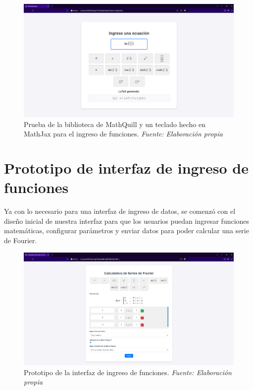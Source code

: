 \begin{figure}[H]
	\centering
	\includegraphics[width=1\textwidth]{img/chapter06/prueba_mathquill_mathjax.png}
	\caption[Prueba de la biblioteca de MathQuill y un teclado hecho en MathJax para el ingreso de funciones.]{Prueba de la biblioteca de MathQuill y un teclado hecho en MathJax para el ingreso de funciones. \textit{Fuente: Elaboración propia}}
	\label{fig:prueba_mathquill_mathjax}
\end{figure}

\section{Prototipo de interfaz de ingreso de funciones}
Ya con lo necesario para una interfaz de ingreso de datos, se comenzó con el diseño inicial de nuestra interfaz para que los usuarios puedan ingresar funciones matemáticas, configurar parámetros y enviar datos para poder calcular una serie de Fourier.

\begin{figure}[H]
	\centering
	\includegraphics[width=1\textwidth]{img/chapter06/prueba_UI.png}
	\caption[Prototipo de la interfaz de ingreso de funciones.]{Prototipo de la interfaz de ingreso de funciones. \textit{Fuente: Elaboración propia}}
	\label{fig:prueba_UI}
\end{figure}

